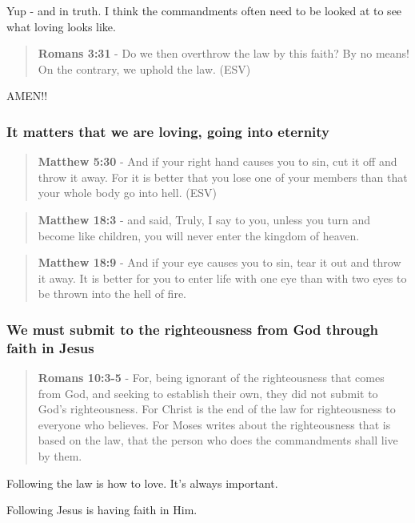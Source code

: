 \documentclass[11pt]{article}
\begin{document}
Yup - and in truth. I think the commandments often need to be looked at to see what loving looks like.

\begin{quote}
\textbf{Romans 3:31} - Do we then overthrow the law by this faith? By no means! On the contrary, we uphold the law. (ESV)
\end{quote}

AMEN!!

\subsubsection{It matters that we are loving, going into eternity}
\label{sec:org7309d82}
\begin{quote}
\textbf{Matthew 5:30} - And if your right hand causes you to sin, cut it off and throw it away. For it is better that you lose one of your members than that your whole body go into hell. (ESV)
\end{quote}

\begin{quote}
\textbf{Matthew 18:3} - and said, Truly, I say to you, unless you turn and become like children, you will never enter the kingdom of heaven.
\end{quote}

\begin{quote}
\textbf{Matthew 18:9} - And if your eye causes you to sin, tear it out and throw it away. It is better for you to enter life with one eye than with two eyes to be thrown into the hell of fire.
\end{quote}

\subsubsection{We must submit to the righteousness from God through faith in Jesus}
\label{sec:org29dbb56}
\begin{quote}
\textbf{Romans 10:3-5} - For, being ignorant of the righteousness that comes from God, and seeking to establish their own, they did not submit to God's righteousness. For Christ is the end of the law for righteousness to everyone who believes. For Moses writes about the righteousness that is based on the law, that the person who does the commandments shall live by them.
\end{quote}

Following the law is how to love. It's always important.

Following Jesus is having faith in Him.
\end{document}
